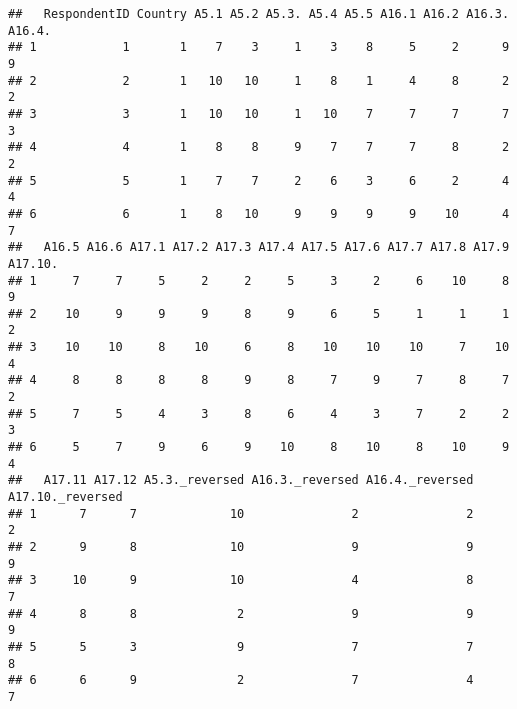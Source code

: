 \documentclass[
]{article}
\begin{document}
\begin{verbatim}
##   RespondentID Country A5.1 A5.2 A5.3. A5.4 A5.5 A16.1 A16.2 A16.3. A16.4.
## 1            1       1    7    3     1    3    8     5     2      9      9
## 2            2       1   10   10     1    8    1     4     8      2      2
## 3            3       1   10   10     1   10    7     7     7      7      3
## 4            4       1    8    8     9    7    7     7     8      2      2
## 5            5       1    7    7     2    6    3     6     2      4      4
## 6            6       1    8   10     9    9    9     9    10      4      7
##   A16.5 A16.6 A17.1 A17.2 A17.3 A17.4 A17.5 A17.6 A17.7 A17.8 A17.9 A17.10.
## 1     7     7     5     2     2     5     3     2     6    10     8       9
## 2    10     9     9     9     8     9     6     5     1     1     1       2
## 3    10    10     8    10     6     8    10    10    10     7    10       4
## 4     8     8     8     8     9     8     7     9     7     8     7       2
## 5     7     5     4     3     8     6     4     3     7     2     2       3
## 6     5     7     9     6     9    10     8    10     8    10     9       4
##   A17.11 A17.12 A5.3._reversed A16.3._reversed A16.4._reversed A17.10._reversed
## 1      7      7             10               2               2                2
## 2      9      8             10               9               9                9
## 3     10      9             10               4               8                7
## 4      8      8              2               9               9                9
## 5      5      3              9               7               7                8
## 6      6      9              2               7               4                7
\end{verbatim}
\end{document}
